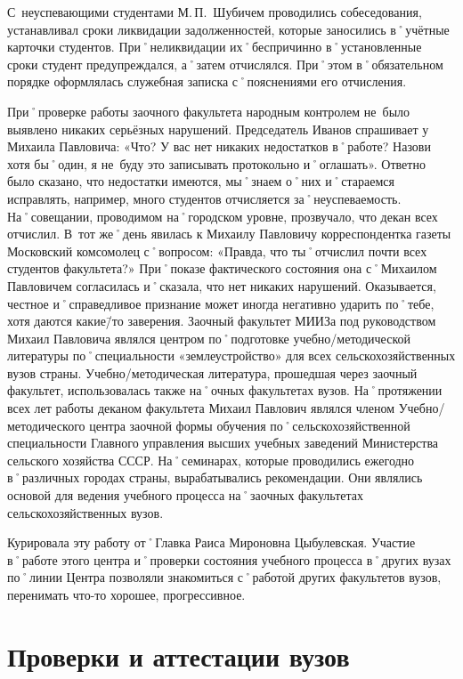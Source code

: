 С~неуспевающими студентами М.\,П.~Шубичем проводились собеседования, устанавливал сроки ликвидации задолженностей, которые заносились в˚учётные карточки студентов. При˚неликвидации их˚беспричинно в˚установленные сроки студент предупреждался, а˚затем отчислялся. При˚этом в˚обязательном порядке оформлялась служебная записка с˚пояснениями его отчисления.

При˚проверке работы заочного факультета народным контролем не~было выявлено никаких серьёзных нарушений. Председатель Иванов спрашивает у Михаила Павловича: «Что? У вас нет никаких недостатков в˚работе? Назови хотя бы˚один, я не~буду это записывать протокольно и˚оглашать». Ответно было сказано, что недостатки имеются, мы˚знаем о˚них и˚стараемся исправлять, например, много  студентов отчисляется за˚неуспеваемость. На˚совещании, проводимом на˚городском уровне, прозвучало, что декан всех отчислил. В~тот же˚день явилась к Михаилу Павловичу корреспондентка газеты Московский комсомолец с˚вопросом: «Правда, что ты˚отчислил почти всех студентов факультета?» При˚показе фактического состояния она с˚Михаилом Павловичем согласилась и˚сказала, что нет никаких нарушений. Оказывается, честное и˚справедливое признание может иногда негативно ударить по˚тебе, хотя даются какие\=/то заверения. 
Заочный факультет МИИЗа под руководством Михаил Павловича являлся центром по˚подготовке учебно\-/методической литературы по˚специальности «землеустройство» для всех сельскохозяйственных вузов страны. Учебно\-/методическая литература, прошедшая через заочный факультет, использовалась также на˚очных факультетах вузов.
На˚протяжении всех лет работы деканом факультета Михаил Павлович являлся членом Учебно\-/методического центра заочной формы обучения по˚сельскохозяйственной специальности Главного управления высших учебных заведений Министерства сельского хозяйства СССР. На˚семинарах, которые проводились ежегодно в˚различных городах страны, вырабатывались рекомендации. Они являлись основой для ведения учебного процесса на˚заочных факультетах сельскохозяйственных вузов.

Курировала эту работу от˚Главка Раиса Мироновна Цыбулевская. Участие в˚работе этого центра и˚проверки состояния учебного процесса в˚других вузах по˚линии Центра позволяли знакомиться с˚работой других факультетов вузов, перенимать что-то хорошее, прогрессивное.

\section*{Проверки и аттестации вузов}
\label{sec:deskwork}

